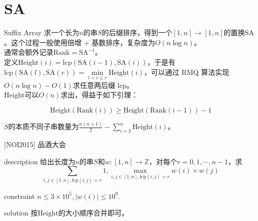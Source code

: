 \documentclass{beamer}
\theoremstyle{compact}
\def\le{\leqslant}
\def\ge{\geqslant}
\def\lcp{\textrm{lcp}}
\begin{document}
\section{SA}
\begin{frame}{Suffix Array}
	求一个长为$n$的串$S$的后缀排序，得到一个$[1, n] \to [1, n]$的置换$\mathrm{SA}$。这个过程一般使用倍增 + 基数排序，复杂度为$O(n \log n)$。\\
	
	通常会额外记录$\mathrm{Rank} = \mathrm{SA}^{-1}$。\pause\\
	
	定义$\mathrm{Height}(i) = \lcp(\mathrm{SA}(i-1), \mathrm{SA}(i))$，于是有$\lcp(\mathrm{SA}(l), \mathrm{SA}(r)) = \min\limits_{l < i \le r}\mathrm{Height}(i)$，可以通过 RMQ 算法实现$O(n\log n) - O(1)$求任意两后缀 \lcp。\\
	
	$\mathrm{Height}$可以$O(n)$求出，得益于如下引理：
	\begin{lemma}
		$$\mathrm{Height}(\mathrm{Rank}(i)) \ge \mathrm{Height}(\mathrm{Rank}(i-1)) - 1$$
	\end{lemma}

	\pause
	$S$的本质不同子串数量为$\frac{n(n+1)}{2} - \sum\limits_{i=2}^{n}\mathrm{Height}(i)$。
\end{frame}
\begin{frame}{[NOI2015] 品酒大会}
	\begin{block}{description}
		给出长度为$n$的串$S$和$w: [1, n] \to \mathbb Z$，对每个$r = 0, 1, \cdots, n-1$，求$$\sum_{i, j \in [1, n], \lcp(i, j) = r} 1, \max_{i, j \in [1, n], \lcp(i, j) = r} w(i) \times w(j)$$
	\end{block}
	\begin{block}{constraint}
		$n \le 3 \times 10^5, |w(i)| \le 10^9.$
	\end{block}
	\pause
	\begin{block}{solution}
		按$\mathrm{Height}$的大小顺序合并即可。
	\end{block}
\end{frame}
\end{document}
